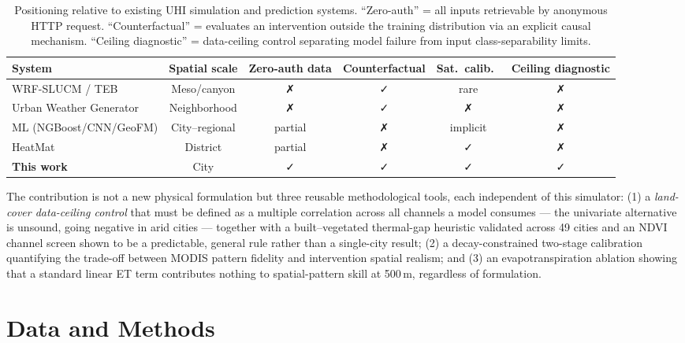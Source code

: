 \documentclass[conference]{IEEEtran}
\begin{document}
\begin{table}[t]
  \centering
  \caption{Positioning relative to existing UHI simulation and prediction
  systems. ``Zero-auth'' = all inputs retrievable by anonymous HTTP request. ``Counterfactual'' = evaluates an intervention outside the training distribution via an explicit causal mechanism. ``Ceiling diagnostic'' = data-ceiling control separating model failure from input class-separability limits.}
  \label{tab:novelty}
  \small
  \begin{tabular}{lccccc}
    \toprule
    System & Spatial scale & Zero-auth data & Counterfactual
           & Sat.\ calib.\ & Ceiling diagnostic \\
    \midrule
    WRF-SLUCM / TEB \cite{kusaka2001simple, masson2000physically} & Meso/canyon & ✗ & ✓ & rare & ✗ \\
    Urban Weather Generator \cite{bueno2013urban} & Neighborhood & ✗ & ✓ & ✗ & ✗ \\
    ML (NGBoost/CNN/GeoFM) \cite{lyu2022integrated,hoang2025geospatial} & City--regional & partial & ✗ & implicit & ✗ \\
    HeatMat \cite{heatmat2025} & District & partial & ✗ & ✓ & ✗ \\
    \textbf{This work} & City & ✓ & ✓ & ✓ & ✓ \\
    \bottomrule
  \end{tabular}
\end{table}

The contribution is not a new physical formulation but three reusable
methodological tools, each independent of this simulator: (1) a
\emph{land-cover data-ceiling control} that must be defined as a multiple
correlation across all channels a model consumes — the univariate
alternative is unsound, going negative in arid cities — together with a
built--vegetated thermal-gap heuristic validated across 49 cities and an
NDVI channel screen shown to be a predictable, general rule rather than a
single-city result; (2) a decay-constrained two-stage calibration
quantifying the trade-off between MODIS pattern fidelity and intervention
spatial realism; and (3) an evapotranspiration ablation showing that a
standard linear ET term contributes nothing to spatial-pattern skill at
500\,m, regardless of formulation.

\section{Data and Methods}
\end{document}

